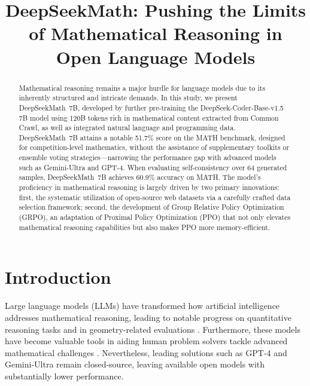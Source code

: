 \title{DeepSeekMath: Pushing the Limits of Mathematical Reasoning in Open Language Models}

\begin{abstract}
Mathematical reasoning remains a major hurdle for language models due to its inherently structured and intricate demands. In this study, we present DeepSeekMath~7B, developed by further pre-training the DeepSeek-Coder-Base-v1.5 7B model using 120B tokens rich in mathematical content extracted from Common Crawl, as well as integrated natural language and programming data. DeepSeekMath~7B attains a notable 51.7\% score on the MATH benchmark, designed for competition-level mathematics, without the assistance of supplementary toolkits or ensemble voting strategies—narrowing the performance gap with advanced models such as Gemini-Ultra and GPT-4. When evaluating self-consistency over 64 generated samples, DeepSeekMath~7B achieves 60.9\% accuracy on MATH. The model’s proficiency in mathematical reasoning is largely driven by two primary innovations: first, the systematic utilization of open-source web datasets via a carefully crafted data selection framework; second, the development of Group Relative Policy Optimization (GRPO), an adaptation of Proximal Policy Optimization (PPO) that not only elevates mathematical reasoning capabilities but also makes PPO more memory-efficient.
\end{abstract}

\section{Introduction}

Large language models (LLMs) have transformed how artificial intelligence addresses mathematical reasoning, leading to notable progress on quantitative reasoning tasks \citep{MATH} and in geometry-related evaluations \citep{trinh2024solving}. Furthermore, these models have become valuable tools in aiding human problem solvers tackle advanced mathematical challenges \citep{tao}. Nevertheless, leading solutions such as GPT-4 \citep{gpt4} and Gemini-Ultra \citep{gemini} remain closed-source, leaving available open models with substantially lower performance.

